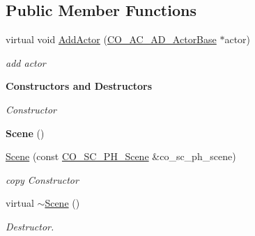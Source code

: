 \subsection*{Public Member Functions}
\begin{DoxyCompactItemize}
\item 
\hypertarget{classContent_1_1Scene_1_1Physics_1_1Scene_a43b712fd47a346c2fe49e5ca74b3c6f4}{
virtual void \hyperlink{classContent_1_1Scene_1_1Physics_1_1Scene_a43b712fd47a346c2fe49e5ca74b3c6f4}{AddActor} (\hyperlink{classContent_1_1Actor_1_1Admin_1_1ActorBase}{CO\_\-AC\_\-AD\_\-ActorBase} $\ast$actor)}
\label{classContent_1_1Scene_1_1Physics_1_1Scene_a43b712fd47a346c2fe49e5ca74b3c6f4}

\begin{DoxyCompactList}\small\item\em add actor \item\end{DoxyCompactList}\end{DoxyCompactItemize}
\begin{Indent}{\bf Constructors and Destructors}\par
{\em \label{_amgrp64fb2b8a2107864a2f56d3f7cc47f3aa}
 Constructor }\begin{DoxyCompactItemize}
\item 
\hypertarget{classContent_1_1Scene_1_1Physics_1_1Scene_ac55a3d0229eda875493290a6de48fedc}{
{\bfseries Scene} ()}
\label{classContent_1_1Scene_1_1Physics_1_1Scene_ac55a3d0229eda875493290a6de48fedc}

\item 
\hypertarget{classContent_1_1Scene_1_1Physics_1_1Scene_afc2265bcf4530a812a7abab034038be9}{
\hyperlink{classContent_1_1Scene_1_1Physics_1_1Scene_afc2265bcf4530a812a7abab034038be9}{Scene} (const \hyperlink{classContent_1_1Scene_1_1Physics_1_1Scene}{CO\_\-SC\_\-PH\_\-Scene} \&co\_\-sc\_\-ph\_\-scene)}
\label{classContent_1_1Scene_1_1Physics_1_1Scene_afc2265bcf4530a812a7abab034038be9}

\begin{DoxyCompactList}\small\item\em copy Constructor \item\end{DoxyCompactList}\item 
\hypertarget{classContent_1_1Scene_1_1Physics_1_1Scene_adb3b1fd4038e23ccd79d6e50cf16cf89}{
virtual \hyperlink{classContent_1_1Scene_1_1Physics_1_1Scene_adb3b1fd4038e23ccd79d6e50cf16cf89}{$\sim$Scene} ()}
\label{classContent_1_1Scene_1_1Physics_1_1Scene_adb3b1fd4038e23ccd79d6e50cf16cf89}

\begin{DoxyCompactList}\small\item\em Destructor. \item\end{DoxyCompactList}\end{DoxyCompactItemize}
\end{Indent}
